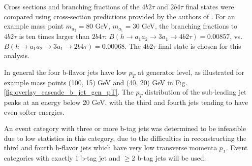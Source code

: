 Cross sections and branching fractions of the $4b2\tau$ and $2b4\tau$ final states were compared using cross-section predictions provided by the authors of \cite{Robens:2019kga}. For an example mass point $m_{a_2} = 80$ GeV, $m_{a_1} = 30$ GeV, the branching fractions to $4b2\tau$ is ten times larger than $2b4\tau$: $B(h \rightarrow a_1 a_2 \rightarrow 3 a_1 \rightarrow 4b2\tau) = 0.00857$, vs. $B(h \rightarrow a_1 a_2 \rightarrow 3 a_1 \rightarrow 2b4\tau) = 0.00068$. The $4b2\tau$ final state is chosen for this analysis.

In general the four b-flavor jets have low $p_{T}$ at generator level, as illustrated for example mass points (100, 15) GeV and (40, 20) GeV in Fig. \ref{fig:overlay_cascade_b_jet_gen_pT}. The $p_{T}$ distribution of the sub-leading jet peaks at an energy below 20 GeV, with the third and fourth jets tending to have even softer energies.

An event category with three or more b-tag jets was determined to be infeasible due to low statistics in this category, due to the difficulties in reconstructing the third and fourth b-flavor jets which have very low transverse momenta $p_{T}$. Event categories with exactly 1 b-tag jet and $\geq 2$ b-tag jets will be used.


